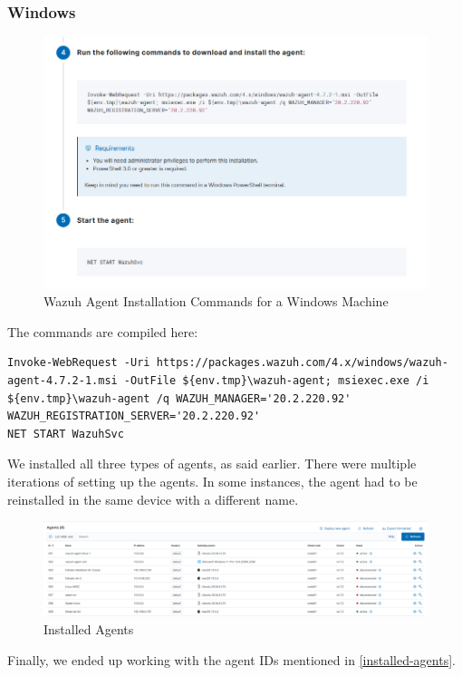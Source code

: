 \begin{itemize}
    \subsubsection{Windows}
    \begin{figure}[H]
      \centering
      \includegraphics[width=\textwidth]{images/setup/wazuh-agent-commands-win.png}
      \caption{Wazuh Agent Installation Commands for a Windows Machine}
    \end{figure}
    The commands are compiled here:
    \begin{verbatim}
Invoke-WebRequest -Uri https://packages.wazuh.com/4.x/windows/wazuh-agent-4.7.2-1.msi -OutFile ${env.tmp}\wazuh-agent; msiexec.exe /i ${env.tmp}\wazuh-agent /q WAZUH_MANAGER='20.2.220.92' WAZUH_REGISTRATION_SERVER='20.2.220.92' 
NET START WazuhSvc
    \end{verbatim}
\end{itemize}

We installed all three types of agents, as said earlier. There were multiple iterations of setting up the agents. In some instances, the agent had to be reinstalled in the same device with a different name.
\begin{figure}[H]
    \centering
    \includegraphics[width=\textwidth]{images/setup/all-agents.png}
    \caption{Installed Agents}
    \label{fig:installed-agents}
\end{figure}

Finally, we ended up working with the agent IDs mentioned in \ref{installed-agents}.